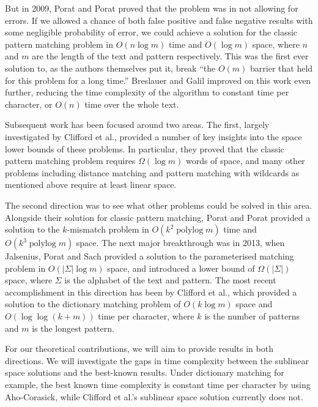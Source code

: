 \documentclass[a4paper,11pt]{article}
\DeclareMathOperator\polylog{polylog}
\begin{document}
    But in 2009, Porat and Porat \cite{5438620} proved that the problem was in not allowing for errors. If we allowed a chance of both false positive and false negative results with some negligible probability of error, we could achieve a solution for the classic pattern matching problem in $O(n\log m)$ time and $O(\log m)$ space, where $n$ and $m$ are the length of the text and pattern respectively. This was the first ever solution to, as the authors themselves put it, break ``the $O(m)$ barrier that held for this problem for a long time.'' Breslauer and Galil \cite{Breslauer:2014:RSS:2660854.2635814} improved on this work even further, reducing the time complexity of the algorithm to constant time per character, or $O(n)$ time over the whole text.

    Subsequent work has been focused around two areas. The first, largely investigated by Clifford et al.\@ \cite{DBLP:journals/corr/abs-1106-4412}, provided a number of key insights into the space lower bounds of these problems. In particular, they proved that the classic pattern matching problem requires $\Omega(\log m)$ words of space, and many other problems including distance matching and pattern matching with wildcards as mentioned above require at least linear space.

    The second direction was to see what other problems could be solved in this area. Alongside their solution for classic pattern matching, Porat and Porat \cite{5438620} provided a solution to the $k$-mismatch problem in $O(k^2\polylog m)$ time and $O(k^3\polylog m)$ space. The next major breakthrough was in 2013, when Jalsenius, Porat and Sach \cite{JPS:2013} provided a solution to the parameterised matching problem in $O(|\Sigma|\log m)$ space, and introduced a lower bound of $\Omega(|\Sigma|)$ space, where $\Sigma$ is the alphabet of the text and pattern. The most recent accomplishment in this direction has been by Clifford et al.\@ \cite{2015arXiv150406242C}, which provided a solution to the dictionary matching problem of $O(k\log m)$ space and $O(\log\log(k + m))$ time per character, where $k$ is the number of patterns and $m$ is the longest pattern.

    For our theoretical contributions, we will aim to provide results in both directions. We will investigate the gaps in time complexity between the sublinear space solutions and the best-known results. Under dictionary matching for example, the best known time complexity is constant time per character by using Aho-Corasick, while Clifford et al.'s sublinear space solution currently does not.
\end{document}
